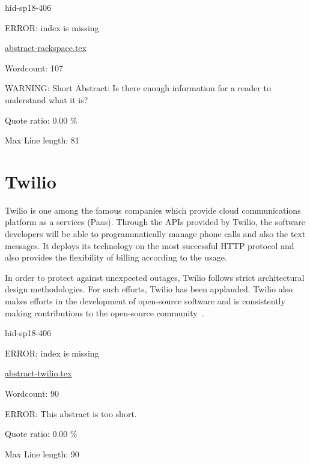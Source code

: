  


\begin{IU}

hid-sp18-406

ERROR: index is missing

\href{https://github.com/cloudmesh-community/hid-sp18-406/blob/master//technology/abstract-rackspace.tex}{abstract-rackspace.tex}

 

Wordcount: 107

WARNING: Short Abstract: Is there enough information for a reader to understand what it is?


Quote ratio: 0.00 \%
 
Max Line length: 81
\end{IU}

\section{Twilio}

Twilio is one among the famous companies which provide cloud communications
platform as a services (Paas). Through the APIs provided by Twilio, the software
developers will be able to programmatically manage phone calls and also the text
messages. It deploys its technology on the most successful HTTP protocol and
also provides the flexibility of billing according to the usage.

In order to protect against unexpected outages, Twilio follows strict
architectural design methodologies. For such efforts, Twilio has been applauded.
Twilio also makes efforts in the development of open-source software and is
consistently making contributions to the open-source community~\cite{hid-sp18-406-Twilio}.





\begin{IU}

hid-sp18-406

ERROR: index is missing

\href{https://github.com/cloudmesh-community/hid-sp18-406/blob/master//technology/abstract-twilio.tex}{abstract-twilio.tex}

 

Wordcount: 90

ERROR: This abstract is too short.


Quote ratio: 0.00 \%
 
Max Line length: 90
\end{IU}

